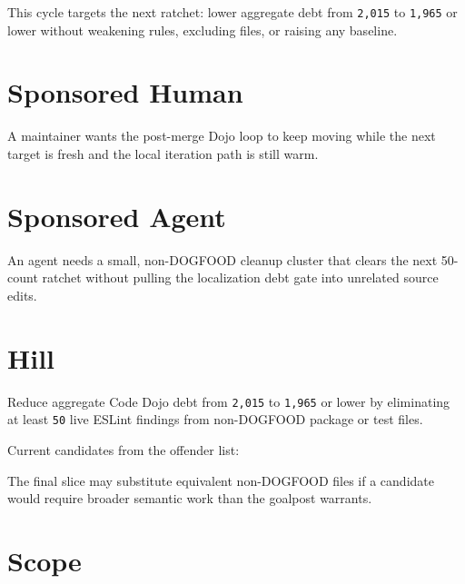 This cycle targets the next ratchet: lower aggregate debt from \texttt{2\allowbreak{},\allowbreak{}0\allowbreak{}1\allowbreak{}5} to \texttt{1\allowbreak{},\allowbreak{}9\allowbreak{}6\allowbreak{}5} or lower without weakening rules, excluding files, or raising any baseline.

\section{Sponsored Human}\label{record-219-sponsored-human}

A maintainer wants the post-merge Dojo loop to keep moving while the next target is fresh and the local iteration path is still warm.

\section{Sponsored Agent}\label{record-219-sponsored-agent}

An agent needs a small, non-DOGFOOD cleanup cluster that clears the next 50-count ratchet without pulling the localization debt gate into unrelated source edits.

\section{Hill}\label{record-219-hill}

Reduce aggregate Code Dojo debt from \texttt{2\allowbreak{},\allowbreak{}0\allowbreak{}1\allowbreak{}5} to \texttt{1\allowbreak{},\allowbreak{}9\allowbreak{}6\allowbreak{}5} or lower by eliminating at least \texttt{5\allowbreak{}0} live ESLint findings from non-DOGFOOD package or test files.

Current candidates from the offender list:



The final slice may substitute equivalent non-DOGFOOD files if a candidate would require broader semantic work than the goalpost warrants.

\section{Scope}\label{record-219-scope}

